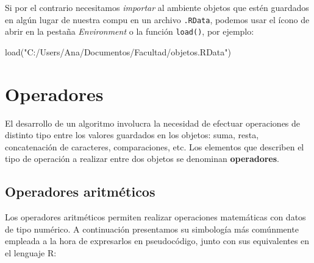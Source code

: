 \documentclass[
]{book}
\newenvironment{Shaded}{\begin{snugshade}}{\end{snugshade}}
\newcommand{\FunctionTok}[1]{\textcolor[rgb]{0.00,0.00,0.00}{#1}}
\newcommand{\NormalTok}[1]{#1}
\newcommand{\StringTok}[1]{\textcolor[rgb]{0.31,0.60,0.02}{#1}}
\begin{document}
Si por el contrario necesitamos \emph{importar} al ambiente objetos que estén guardados en algún lugar de nuestra compu en un archivo \texttt{.RData}, podemos usar el ícono de abrir en la pestaña \emph{Environment} o la función \texttt{load()}, por ejemplo:

\begin{Shaded}
\begin{Highlighting}[]
\FunctionTok{load}\NormalTok{(}\StringTok{"C:/Users/Ana/Documentos/Facultad/objetos.RData"}\NormalTok{)}
\end{Highlighting}
\end{Shaded}

\hypertarget{operadores}{%
\section{Operadores}\label{operadores}}

El desarrollo de un algoritmo involucra la necesidad de efectuar operaciones de distinto tipo entre los valores guardados en los objetos: suma, resta, concatenación de caracteres, comparaciones, etc. Los elementos que describen el tipo de operación a realizar entre dos objetos se denominan \textbf{operadores}.

\hypertarget{operadores-aritmuxe9ticos}{%
\subsection{Operadores aritméticos}\label{operadores-aritmuxe9ticos}}

Los operadores aritméticos permiten realizar operaciones matemáticas con datos de tipo numérico. A continuación presentamos su simbología más comúnmente empleada a la hora de expresarlos en pseudocódigo, junto con sus equivalentes en el lenguaje R:
\end{document}
